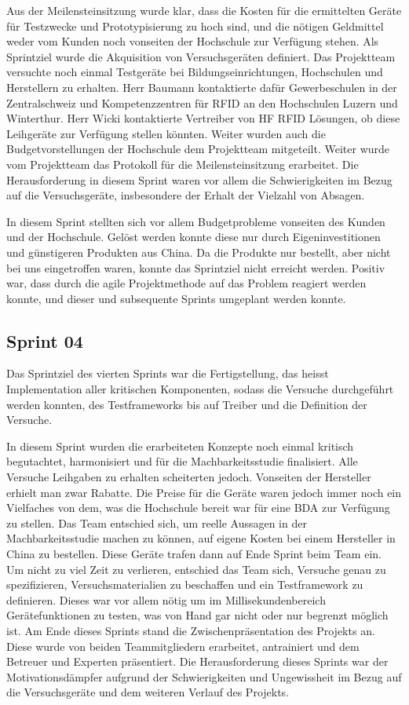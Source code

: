 Aus der Meilensteinsitzung wurde klar, dass die Kosten für die ermittelten Geräte für Testzwecke und Prototypisierung zu hoch sind, und die nötigen Geldmittel weder vom Kunden noch vonseiten der Hochschule zur Verfügung stehen. Als Sprintziel wurde die Akquisition von Versuchsgeräten definiert. Das Projektteam versuchte noch einmal Testgeräte bei Bildungseinrichtungen, Hochschulen und Herstellern zu erhalten. Herr Baumann kontaktierte dafür Gewerbeschulen in der Zentralschweiz und Kompetenzzentren für RFID an den Hochschulen Luzern und Winterthur. Herr Wicki kontaktierte Vertreiber von HF RFID Lösungen, ob diese Leihgeräte zur Verfügung stellen könnten. Weiter wurden auch die Budgetvorstellungen der Hochschule dem Projektteam mitgeteilt. Weiter wurde vom Projektteam das Protokoll für die Meilensteinsitzung erarbeitet. Die Herausforderung in diesem Sprint waren vor allem die Schwierigkeiten im Bezug auf die Versuchsgeräte, insbesondere der Erhalt der Vielzahl von Absagen.

In diesem Sprint stellten sich vor allem Budgetprobleme vonseiten des Kunden und der Hochschule. Gelöst werden konnte diese nur durch Eigeninvestitionen und günstigeren Produkten aus China. Da die Produkte nur bestellt, aber nicht bei uns eingetroffen waren, konnte das Sprintziel nicht erreicht werden. Positiv war, dass durch die agile Projektmethode auf das Problem reagiert werden konnte, und dieser und subsequente Sprints umgeplant werden konnte.

\subsection{Sprint 04}
Das Sprintziel des vierten Sprints war die Fertigstellung, das heisst Implementation aller kritischen Komponenten, sodass die Versuche durchgeführt werden konnten, des Testframeworks bis auf Treiber und die Definition der Versuche.

In diesem Sprint wurden die erarbeiteten Konzepte noch einmal kritisch begutachtet, harmonisiert und für die Machbarkeitsstudie finalisiert. Alle Versuche Leihgaben zu erhalten scheiterten jedoch. Vonseiten der Hersteller erhielt man zwar Rabatte. Die Preise für die Geräte waren jedoch immer noch ein Vielfaches von dem, was die Hochschule bereit war für eine BDA zur Verfügung zu stellen. Das Team entschied sich, um reelle Aussagen in der Machbarkeitsstudie machen zu können, auf eigene Kosten bei einem Hersteller in China zu bestellen. Diese Geräte trafen dann auf Ende Sprint beim Team ein. Um nicht zu viel Zeit zu verlieren, entschied das Team sich, Versuche genau zu spezifizieren, Versuchsmaterialien zu beschaffen und ein Testframework zu definieren. Dieses war vor allem nötig um im Millisekundenbereich Gerätefunktionen zu testen, was von Hand gar nicht oder nur begrenzt möglich ist. Am Ende dieses Sprints stand die Zwischenpräsentation des Projekts an. Diese wurde von beiden Teammitgliedern erarbeitet, antrainiert und dem Betreuer und Experten präsentiert. Die Herausforderung dieses Sprints war der Motivationsdämpfer aufgrund der Schwierigkeiten und Ungewissheit im Bezug auf die Versuchsgeräte und dem weiteren Verlauf des Projekts.

